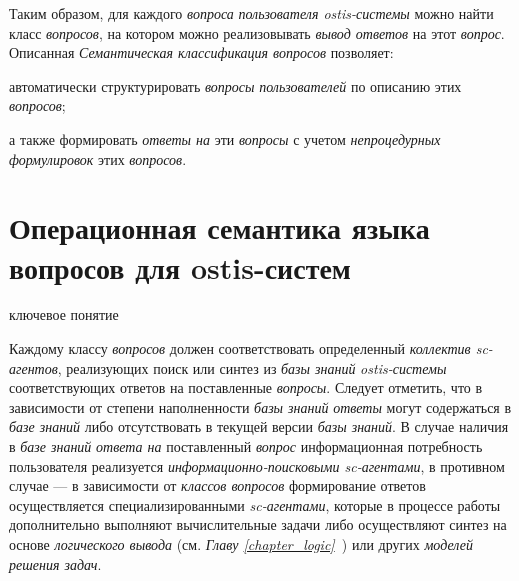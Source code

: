 Таким образом, для каждого \textit{вопроса} \textit{пользователя ostis-системы} можно найти класс \textit{вопросов}, на котором можно реализовывать \textit{вывод ответов} на этот \textit{вопрос}. Описанная \textit{Семантическая классификация вопросов} позволяет:
\begin{textitemize}
	\item автоматически структурировать \textit{вопросы} \textit{пользователей} по описанию этих \textit{вопросов};
	\item а также формировать \textit{ответы на} эти \textit{вопросы} с учетом \textit{непроцедурных формулировок} этих \textit{вопросов}.
\end{textitemize}

\section{Операционная семантика языка вопросов для ostis-систем}
\label{sec_requests_op_semantics}

\begin{SCn}
\begin{scnrelfromlist}{ключевое понятие}
\end{scnrelfromlist}
\end{SCn}

Каждому классу \textit{вопросов} должен соответствовать определенный \textit{коллектив sc-агентов}, реализующих поиск или синтез из \textit{базы знаний} \textit{ostis-системы} соответствующих ответов на поставленные \textit{вопросы}. Следует отметить, что в зависимости от степени наполненности \textit{базы знаний} \textit{ответы} могут содержаться в \textit{базе знаний} либо отсутствовать в текущей версии \textit{базы знаний}. В случае наличия в \textit{базе знаний} \textit{ответа на} поставленный \textit{вопрос} информационная потребность пользователя реализуется \textit{информационно-поисковыми sc-агентами}, в противном случае --- в зависимости от \textit{классов вопросов} формирование ответов осуществляется специализированными \textit{sc-агентами}, которые в процессе работы дополнительно выполняют вычислительные задачи либо осуществляют синтез на основе \textit{логического вывода} (см. \textit{Главу \ref{chapter_logic}~}) или других \textit{моделей решения задач}. 

